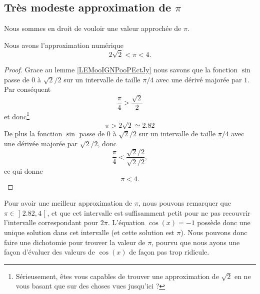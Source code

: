 \subsection{Très modeste approximation de \( \pi\)}
\label{SUBSECooPQVKooAOyxOe}

Nous sommes en droit de vouloir une valeur approchée de \( \pi\). 
\begin{lemma}       \label{LEMooJWSGooExmtDA}
    Nous avons l'approximation numérique
    \begin{equation}
        2\sqrt{ 2 }<\pi<4.
    \end{equation}
\end{lemma}

\begin{proof}
    Grace au lemme \ref{LEMooIGNPooPEctJy} nous savons que la fonction \( \sin\) passe de \( 0\) à \( \sqrt{ 2 }/2\) sur un intervalle de taille \( \pi/4\) avec une dérivé majorée par \( 1\). Par conséquent
    \begin{equation}
        \frac{ \pi }{ 4 }>\frac{ \sqrt{ 2 } }{2}
    \end{equation}
    et donc\footnote{Sérieusement, êtes vous capables de trouver une approximation de \( \sqrt{ 2 }\) en ne vous basant que sur des choses vues jusqu'ici ?}
    \begin{equation}
        \pi>2\sqrt{ 2 }\simeq 2.82
    \end{equation}
    De plus la fonction \( \sin\) passe de \( 0\) à \( \sqrt{ 2 }/2\) sur un intervalle de taille \( \pi/4\) avec une dérivée majorée par \( \sqrt{ 2 }/2\), donc
    \begin{equation}
        \frac{ \pi }{ 4 }<\frac{ \sqrt{ 2 }/2 }{ \sqrt{ 2 }/2 },
    \end{equation}
    ce qui donne
    \begin{equation}
        \pi<4.
    \end{equation}
\end{proof}

Pour avoir une meilleur approximation de \( \pi\), nous pouvons remarquer que \( \pi\in\mathopen] 2.82 , 4 \mathclose[\), et que cet intervalle est suffisamment petit pour ne pas recouvrir l'intervalle correspondant pour \( 2\pi\). L'équation \( \cos(x)=-1\) possède donc une unique solution dans cet intervalle (et cette solution est \( \pi\)). Nous pouvons donc faire une dichotomie pour trouver la valeur de \( \pi\), pourvu que nous ayons une façon d'évaluer des valeurs de \( \cos(x)\) de façon pas trop ridicule.

